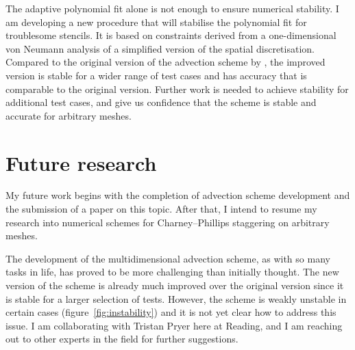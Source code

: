 \documentclass[a4paper,11pt]{article}
\begin{document}
The adaptive polynomial fit alone is not enough to ensure numerical stability.  I am developing a new procedure that will stabilise the polynomial fit for troublesome stencils.  It is based on constraints derived from a one-dimensional von Neumann analysis of a simplified version of the spatial discretisation.  Compared to the original version of the advection scheme by \citet{weller-shahrokhi2014}, the improved version is stable for a wider range of test cases and has accuracy that is comparable to the original version.  Further work is needed to achieve stability for additional test cases, and give us confidence that the scheme is stable and accurate for arbitrary meshes.


\section{Future research}
My future work begins with the completion of advection scheme development and the submission of a paper on this topic.  After that, I intend to resume my research into numerical schemes for Charney--Phillips staggering on arbitrary meshes.

The development of the multidimensional advection scheme, as with so many tasks in life, has proved to be more challenging than initially thought.  The new version of the scheme is already much improved over the original version since it is stable for a larger selection of tests.  However, the scheme is weakly unstable in certain cases (figure~\ref{fig:instability}) and it is not yet clear how to address this issue.  I am collaborating with Tristan Pryer here at Reading, and I am reaching out to other experts in the field for further suggestions.
\end{document}
